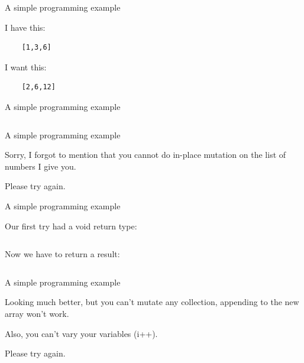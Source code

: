 \documentclass[mathserif]{beamer}
\begin{document}
\begin{frame}[fragile]{A simple programming example}

  {\Large I have this:}
  \begin{verbatim}
    [1,3,6]
  \end{verbatim}

  \vskip5mm

  {\Large I want this:}
  \begin{verbatim}
    [2,6,12]
  \end{verbatim}
\end{frame}

\begin{frame}{A simple programming example}

  \inputminted[firstline=3,lastline=7,gobble=4]{java}{code/java/DoubleAllMutation.java}

\end{frame}

\begin{frame}{A simple programming example}

  {\Large Sorry, I forgot to mention that you cannot do in-place mutation on the list of numbers I give you.

    \vskip5mm

  Please try again.}

\end{frame}

\begin{frame}{A simple programming example}

  Our first try had a void return type:
  \inputminted[firstline=3,lastline=7,gobble=4]{java}{code/java/DoubleAllMutation.java}

  \vskip5mm

  Now we have to return a result:
  \inputminted[firstline=3,lastline=9,gobble=4]{java}{code/java/DoubleAllIterative.java}

\end{frame}

\begin{frame}{A simple programming example}

  {\Large Looking much better, but you can't mutate \alert{any} collection, appending to the new array won't work.}

  \vskip5mm

  {\Large Also, you can't vary your variables (i++).}

  \vskip5mm

  {\Large Please try again.}

\end{frame}
\end{document}

